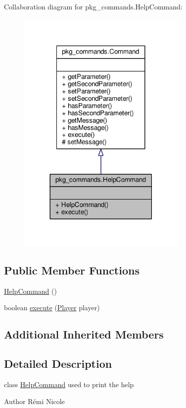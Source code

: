 Collaboration diagram for pkg\-\_\-commands.\-Help\-Command\-:
\nopagebreak
\begin{figure}[H]
\begin{center}
\leavevmode
\includegraphics[width=234pt]{classpkg__commands_1_1HelpCommand__coll__graph}
\end{center}
\end{figure}
\subsection*{Public Member Functions}
\begin{DoxyCompactItemize}
\item 
\hyperlink{classpkg__commands_1_1HelpCommand_a5f12eadc1835cd0c7cdb77811b5fb756}{Help\-Command} ()
\item 
boolean \hyperlink{classpkg__commands_1_1HelpCommand_a332d3e57539dfc82f8c539f8b3e24dd6}{execute} (\hyperlink{classpkg__world_1_1Player}{Player} player)
\end{DoxyCompactItemize}
\subsection*{Additional Inherited Members}


\subsection{Detailed Description}
class \hyperlink{classpkg__commands_1_1HelpCommand}{Help\-Command} used to print the help \begin{DoxyAuthor}{Author}
Rémi Nicole 
\end{DoxyAuthor}


